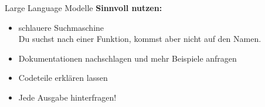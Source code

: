 \begin{frame}{Large Language Modelle}
    \textcolor{vertexDarkRed}{\textbf{Sinnvoll nutzen:}}
    \begin{itemize}
        \item schlauere Suchmaschine \\
            \quad Du suchst nach einer Funktion, kommst aber nicht auf den Namen.
        \item Dokumentationen nachschlagen und mehr Beispiele anfragen
        \item Codeteile erklären lassen
        \item \textcolor{vertexDarkRed}{Jede Ausgabe hinterfragen!}
    \end{itemize}
\end{frame}